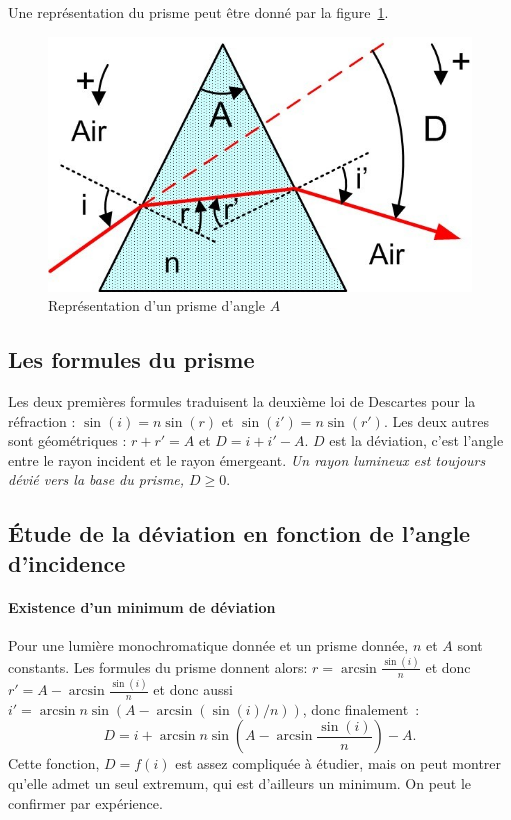 Une représentation du prisme peut être donné par la figure~\ref{fig:prisme}.
\begin{figure}
    \centering
    \includegraphics[scale=1.0]{./prisme.jpg}
    \caption{Représentation d'un prisme d'angle \(A\)}\label{fig:prisme}%
\end{figure}

\subsection{Les formules du prisme}
\label{chap6-subsec:formulesprisme}

Les deux premières formules traduisent la deuxième loi de Descartes pour la réfraction : \(\sin(i) = n\sin(r)\) et \(\sin(i') = n\sin(r')\). Les deux autres sont géométriques : \(r+r'=A\) et \(D=i+i'-A\). \(D\) est la déviation, c'est l'angle entre le rayon incident et le rayon émergeant. \emph{Un rayon lumineux est toujours dévié vers la base du prisme, \(D \geq 0\)}.

\subsection{Étude de la déviation en fonction de l'angle d'incidence}
\label{chap6-subsec:etudedeviation}
\paragraph{Existence d'un minimum de déviation}

Pour une lumière monochromatique donnée et un prisme donnée, \(n\) et \(A\) sont constants. Les formules du prisme donnent alors:
\(r = \arcsin{\frac{\sin(i)}{n}}\) et donc \(r'=A - \arcsin{\frac{\sin(i)}{n}}\) et donc aussi \(i' = \arcsin n\sin (A-\arcsin(\sin(i)/n))\), donc finalement~:
\begin{equation}
  D = i + \arcsin{n\sin\left(A-\arcsin{\frac{\sin(i)}{n}}\right)} -A.
\end{equation}
Cette fonction, \(D=f(i)\) est assez compliquée à étudier, mais on peut montrer qu'elle admet un seul extremum, qui est d'ailleurs un minimum. On peut le confirmer par expérience.

